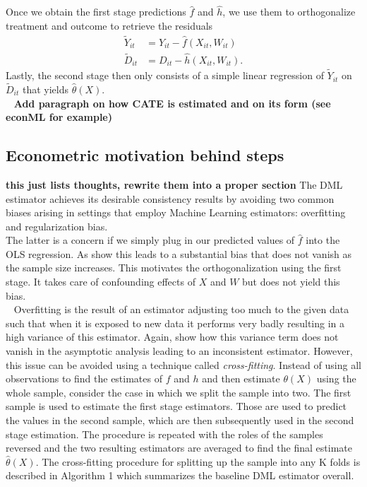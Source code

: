 Once we obtain the first stage predictions $\hat{f}$ and $\hat{h}$, we use them to orthogonalize treatment and outcome to retrieve the residuals 
\begin{align*} 
    \tilde{Y}_{it}&=Y_{it}-\hat{f}(X_{it}, W_{it}) \\ 
    \tilde{D}_{it}&=D_{it}-\hat{h}(X_{it}, W_{it}).
\end{align*}
Lastly, the second stage then only consists of a simple linear regression of $\tilde{Y}_{it}$ on $\tilde{D}_{it}$ that yields $\hat{\theta}(X)$. \\ 
\textbf{Add paragraph on how CATE is estimated and on its form (see econML for example)}

\subsection{Econometric motivation behind steps} \label{sec:biases}
\textbf{this just lists thoughts, rewrite them into a proper section}
The DML estimator achieves its desirable consistency results by avoiding two common biases arising in settings that employ Machine Learning estimators: overfitting and regularization bias. \\
The latter is a concern if we simply plug in our predicted values of $\hat{f}$ into the OLS regression. As \cite{DML2017} show this leads to a substantial bias that does not vanish as the sample size increases. This motivates the orthogonalization using the first stage. It takes care of confounding effects of $X$ and $W$ but does not yield this bias. \\ 
Overfitting is the result of an estimator adjusting too much to the given data such that when it is exposed to new data it performs very badly resulting in a high variance of this estimator. Again, \cite{DML2017} show how this variance term does not vanish in the asymptotic analysis leading to an inconsistent estimator. However, this issue can be avoided using a technique called \textit{cross-fitting}. Instead of using all observations to find the estimates of $f$ and $h$ and then estimate $\theta(X)$ using the whole sample, consider the case in which we split the sample into two. The first sample is used to estimate the first stage estimators. Those are used to predict the values in the second sample, which are then subsequently used in the second stage estimation. The procedure is repeated with the roles of the samples reversed and the two resulting estimators are averaged to find the final estimate $\hat{\theta}(X)$. The cross-fitting procedure for splitting up the sample into any K folds is described in Algorithm 1 which summarizes the baseline DML estimator overall. \\
